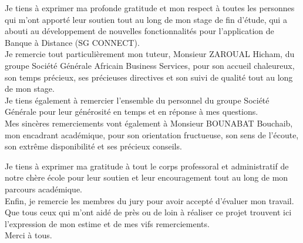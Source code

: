 
\begin{center}
\vspace{3em}
Je tiens à exprimer ma profonde gratitude et mon respect à toutes les personnes qui m'ont apporté leur soutien tout au long de mon stage de fin d'étude, qui a abouti au développement de nouvelles fonctionnalités pour l'application de Banque à Distance (SG CONNECT).\\[0,2cm]

Je remercie tout particulièrement mon tuteur, Monsieur ZAROUAL Hicham, du groupe Société Générale Africain Business Services, pour son accueil chaleureux, son temps précieux, ses précieuses directives et son suivi de qualité tout au long de mon stage.\\[0,2cm]

Je tiens également à remercier l'ensemble du personnel du groupe Société Générale pour leur générosité en temps et en réponse à mes questions.\\[0,2cm]

Mes sincères remerciements vont également à Monsieur BOUNABAT Bouchaib, mon encadrant académique, pour son orientation fructueuse, son sens de l'écoute, son extrême disponibilité et ses précieux conseils.

Je tiens à exprimer ma gratitude à tout le corps professoral et administratif de notre chère école pour leur soutien et leur encouragement tout au long de mon parcours académique.\\[0,2cm]

Enfin, je remercie les membres du jury pour avoir accepté d'évaluer mon travail. Que tous ceux qui m'ont aidé de près ou de loin à réaliser ce projet trouvent ici l'expression de mon estime et de mes vifs remerciements.\\[0,2cm]

Merci à tous.


\end{center}

